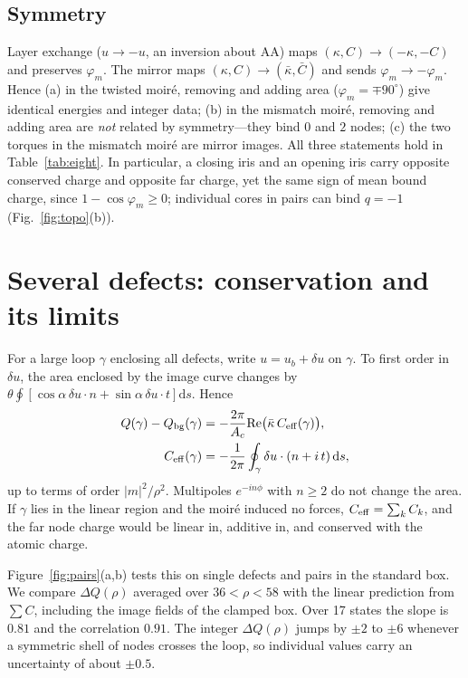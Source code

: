 \documentclass[prb,twocolumn,superscriptaddress,floatfix,10pt]{revtex4-2}
\newcommand{\dd}{\mathrm{d}}
\begin{document}
\subsection{Symmetry}

Layer exchange ($u\to-u$, an inversion about AA) maps $(\kappa,C)\to(-\kappa,-C)$ and preserves $\varphi_m$. The mirror maps $(\kappa,C)\to(\bar\kappa,\bar C)$ and sends $\varphi_m\to-\varphi_m$. Hence (a) in the twisted moir\'e, removing and adding area ($\varphi_m=\mp90^\circ$) give identical energies and integer data; (b) in the mismatch moir\'e, removing and adding area are \emph{not} related by symmetry---they bind $0$ and $2$ nodes; (c) the two torques in the mismatch moir\'e are mirror images. All three statements hold in Table~\ref{tab:eight}. In particular, a closing iris and an opening iris carry opposite conserved charge and opposite far charge, yet the same sign of mean bound charge, since $1-\cos\varphi_m\ge0$; individual cores in pairs can bind $q=-1$ (Fig.~\ref{fig:topo}(b)).

\section{Several defects: conservation and its limits}\label{sec:many}

For a large loop $\gamma$ enclosing all defects, write $u=u_b+\delta u$ on $\gamma$. To first order in $\delta u$, the area enclosed by the image curve changes by $\theta\oint[\cos\alpha\,\delta u\cdot n+\sin\alpha\,\delta u\cdot t]\dd s$. Hence
\begin{align}
Q(\gamma)-Q_{\rm bg}(\gamma)&=-\frac{2\pi}{A_c}{\rm Re}\big(\bar\kappa\,C_{\rm eff}(\gamma)\big),\label{eq:ceff}\\
C_{\rm eff}(\gamma)&=-\frac{1}{2\pi}\oint_\gamma\delta u\cdot(n+i\,t)\,\dd s ,\nonumber
\end{align}
up to terms of order $|m|^2/\rho^2$. Multipoles $e^{-in\phi}$ with $n\ge2$ do not change the area. If $\gamma$ lies in the linear region and the moir\'e induced no forces, $C_{\rm eff}=\sum_kC_k$, and the far node charge would be linear in, additive in, and conserved with the atomic charge.

Figure~\ref{fig:pairs}(a,b) tests this on single defects and pairs in the standard box. We compare $\Delta Q(\rho)$ averaged over $36<\rho<58$ with the linear prediction from $\sum C$, including the image fields of the clamped box. Over 17 states the slope is $0.81$ and the correlation $0.91$. The integer $\Delta Q(\rho)$ jumps by $\pm2$ to $\pm6$ whenever a symmetric shell of nodes crosses the loop, so individual values carry an uncertainty of about $\pm0.5$.
\end{document}

